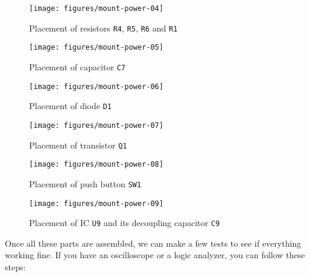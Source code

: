 \begin{figure}[h]
  \centering
  \texttt{[image: figures/mount-power-04]}
  \caption{Placement of resistors {\tt R4}, {\tt R5}, {\tt R6} and {\tt R1}}
  \label{fig:mount-power-04}
\end{figure}

\begin{figure}[h]
  \centering
  \texttt{[image: figures/mount-power-05]}
  \caption{Placement of capacitor {\tt C7}}
  \label{fig:mount-power-05}
\end{figure}

\begin{figure}[h]
  \centering
  \texttt{[image: figures/mount-power-06]}
  \caption{Placement of diode {\tt D1}}
  \label{fig:mount-power-06}
\end{figure}

\begin{figure}[h]
  \centering
  \texttt{[image: figures/mount-power-07]}
  \caption{Placement of transistor {\tt Q1}}
  \label{fig:mount-power-07}
\end{figure}

\begin{figure}[h]
  \centering
  \texttt{[image: figures/mount-power-08]}
  \caption{Placement of push button {\tt SW1}}
  \label{fig:mount-power-08}
\end{figure}

\begin{figure}[h]
  \centering
  \texttt{[image: figures/mount-power-09]}
  \caption{Placement of IC {\tt U9} and its decoupling capacitor {\tt C9}}
  \label{fig:mount-power-09}
\end{figure}

Once all these parts are assembled, we can make a few tests to see if everything working fine. If you have an oscilloscope or a logic analyzer, you can follow these steps:

